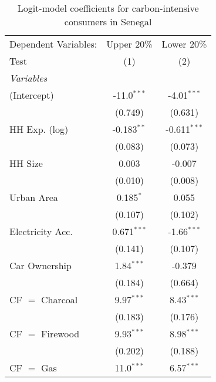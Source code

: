 
\begin{table}[htbp!]
   \centering
   \small
   \begin{adjustbox}{width = 1\textwidth, max height = 0.95\textheight, center}
      \begin{threeparttable}[b]
         \caption{\label{tab:Logit_1_SEN} Logit-model coefficients for carbon-intensive consumers in Senegal}
         \begin{tabular}{lcc}
            \tabularnewline \midrule \midrule
            Dependent Variables: & Upper 20\%    & Lower 20\%\\   
            Test                 & (1)           & (2)\\  
            \midrule
            \emph{Variables}\\
            (Intercept)          & -11.0$^{***}$ & -4.01$^{***}$\\   
                                 & (0.749)       & (0.631)\\   
            HH Exp. (log)        & -0.183$^{**}$ & -0.611$^{***}$\\   
                                 & (0.083)       & (0.073)\\   
            HH Size              & 0.003         & -0.007\\   
                                 & (0.010)       & (0.008)\\   
            Urban Area           & 0.185$^{*}$   & 0.055\\   
                                 & (0.107)       & (0.102)\\   
            Electricity Acc.     & 0.671$^{***}$ & -1.66$^{***}$\\   
                                 & (0.141)       & (0.107)\\   
            Car Ownership        & 1.84$^{***}$  & -0.379\\   
                                 & (0.184)       & (0.664)\\   
            CF $=$ Charcoal      & 9.97$^{***}$  & 8.43$^{***}$\\   
                                 & (0.183)       & (0.176)\\   
            CF $=$ Firewood      & 9.93$^{***}$  & 8.98$^{***}$\\   
                                 & (0.202)       & (0.188)\\   
            CF $=$ Gas           & 11.0$^{***}$  & 6.57$^{***}$\\   

\end{tabular}
\end{threeparttable}
\end{adjustbox}
\end{table}

